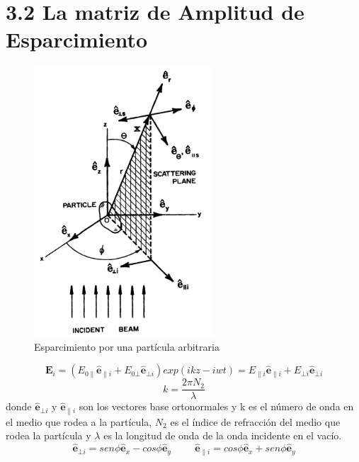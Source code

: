 \documentclass[graybox]{svmult}
\begin{document}
\section*{ 3.2 La matriz de Amplitud de Esparcimiento}
\label{sec:2}

\begin{figure}[H]
\centering
\includegraphics[width=0.6\textwidth]{321.png}
\caption{Esparcimiento por una partícula arbitraria}
\label{fig:p1}
\end{figure}
\begin{equation*}
\textbf{E}_{i}=(E_{0\parallel}\hat{\textbf{e}}_{\parallel i}+E_{0\bot}\hat{\textbf{e}}_{\bot i})exp(ikz-iwt)=E_{\parallel i}\hat{\textbf{e}}_{\parallel i}+E_{\bot i}\hat{\textbf{e}}_{\bot i}
\end{equation*}
\begin{equation*}
k=\frac{2\pi N_{2}}{\lambda}
\end{equation*}
donde $\hat{\textbf{e}}_{\bot i}$ y $\hat{\textbf{e}}_{\parallel i}$ son los vectores base ortonormales y k es el número de onda en el medio que rodea a la partícula, $N_{2}$ es el índice de refracción del medio que rodea la partícula y $\lambda$ es la longitud de onda de la onda incidente en el vacío.
\begin{equation*}
\hat{\textbf{e}}_{\bot i}=sen\phi \hat{\textbf{e}}_{x}-cos\phi \hat{\textbf{e}}_{y} \hspace{1cm} \hat{\textbf{e}}_{\parallel i}=cos\phi \hat{\textbf{e}}_{x}+sen\phi \hat{\textbf{e}}_{y}
\end{equation*}
\end{document}
